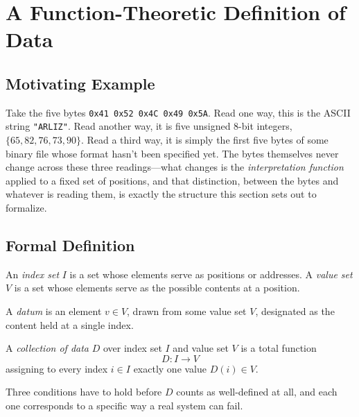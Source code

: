\section{A Function-Theoretic Definition of Data}
\label{sec:definition}

\subsection{Motivating Example}

Take the five bytes \texttt{0x41 0x52 0x4C 0x49 0x5A}. Read one way, this
is the ASCII string \texttt{"ARLIZ"}. Read another way, it is five
unsigned 8-bit integers, $\{65, 82, 76, 73, 90\}$. Read a third way, it is
simply the first five bytes of some binary file whose format hasn't been
specified yet. The bytes themselves never change across these three
readings---what changes is the \emph{interpretation function} applied to
a fixed set of positions, and that distinction, between the bytes and
whatever is reading them, is exactly the structure this section sets out
to formalize.

\subsection{Formal Definition}

\begin{definition}
\label{def:index-value}
An \emph{index set} $I$ is a set whose elements serve as positions or
addresses. A \emph{value set} $V$ is a set whose elements serve as the
possible contents at a position.
\end{definition}

\begin{definition}[Datum]
\label{def:datum}
A \emph{datum} is an element $v \in V$, drawn from some value set $V$,
designated as the content held at a single index.
\end{definition}

\begin{definition}
\label{def:collection}
A \emph{collection of data} $D$ over index set $I$ and value set $V$ is a
total function
\[
  D : I \to V
\]
assigning to every index $i \in I$ exactly one value $D(i) \in V$.
\end{definition}

Three conditions have to hold before $D$ counts as well-defined at all,
and each one corresponds to a specific way a real system can fail.

